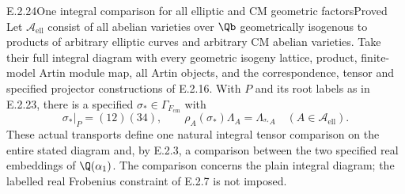 \begin{result}{E.2.24}{One integral comparison for all elliptic and CM geometric factors}{Proved}
Let \(\mathcal A_{\mathrm{ell}}\) consist of all abelian
varieties over \(\Qb\) geometrically isogenous to products
of arbitrary elliptic curves and arbitrary CM abelian varieties.
Take their full integral diagram with every geometric isogeny
lattice, product, finite-model Artin module map, all Artin
objects, and the correspondence, tensor and specified projector
constructions of E.2.16.
With \(P\) and its root labels as in E.2.23, there is a
specified \(\sigma_*\in\Gamma_{F_{\mathrm{cm}}}\) with
\[
 \sigma_*|_P=(12)(34),\qquad
 \rho_A(\sigma_*)\Lambda_A=\Lambda_{{}^{\sigma_*}A}
            \quad(A\in\mathcal A_{\mathrm{ell}}).
 \tag{E.2.24a}
\]
These actual transports define one natural integral tensor
comparison on the entire stated diagram and, by E.2.3, a
comparison between the two specified real embeddings of
\(\Q(\alpha_1)\). The comparison concerns the plain integral
diagram; the labelled real Frobenius constraint of E.2.7 is
not imposed.
\end{result}
